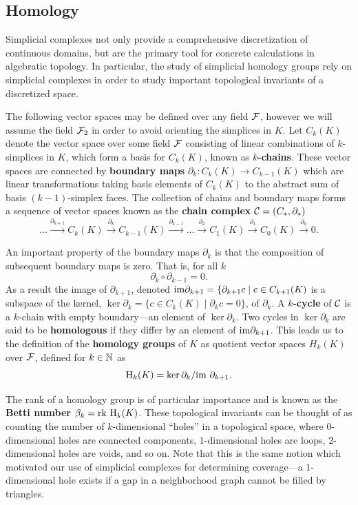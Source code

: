 
\subsection{Homology} %
\label{sec:homology}

Simplicial complexes not only provide a comprehensive discretization of continuous domains, but are the primary tool for concrete calculations in algebratic topology.
In particular, the study of simplicial homology groups rely on simplicial complexes in order to study important topological invariants of a discretized space.

The following vector spaces may be defined over any field $\mathcal{F}$, however we will assume the field $\mathcal{F}_2$ in order to avoid orienting the simplices in $K$.
Let $C_k(K)$ denote the vector space over some field $\mathcal{F}$ consisting of linear combinations of $k$-simplices in $K$, which form a basis for $C_k(K)$, known as \textbf{$k$-chains}.
These vector spaces are connected by \textbf{boundary maps} $\partial_k:C_k(K)\to C_{k-1}(K)$ which are linear transformations taking basis elements of $C_k(K)$ to the abstract sum of basis $(k-1)$-simplex faces.
The collection of chains and boundary maps forms a sequence of vector spaces known as the \textbf{chain complex} $\mathcal{C} = (C_*,\partial_*)$
\[
    \ldots\xrightarrow{\partial_{k+1}}
    C_k(K)\xrightarrow{\partial_{k}}
    C_{k-1}(K)\xrightarrow{\partial_{k-1}}
    \ldots\xrightarrow{\partial_2}
    C_1(K)\xrightarrow{\partial_{1}}
    C_0(K)\xrightarrow{\partial_0} 0.
\]

An important property of the boundary maps $\partial_k$ is that the composition of subsequent boundary maps is zero.
That is, for all $k$
\[
  \partial_k\circ\partial_{k-1} = 0.
\]
As a result the image of $\partial_{k+1}$, denoted $\mathrm{im}\partial_{k+1} = \{\partial_{k+1}c\mid c\in C_{k+1}(K)$ is a subspace of the kernel, $\ker\partial_k = \{c\in C_k(K)\mid \partial_k c = 0\}$, of $\partial_k$.
A \textbf{$k$-cycle} of $\mathcal{C}$ is a $k$-chain with empty boundary---an element of $\ker\partial_k$.
Two cycles in $\ker\partial_k$ are said to be \textbf{homologous} if they differ by an element of $\mathrm{im}\partial_{k+1}$.
This leads us to the definition of the \textbf{homology groups} of $K$ as quotient vector spaces $H_k(K)$ over $\mathcal{F}$, defined for $k\in\mathbb{N}$ as
\[
  \mathrm{H}_k(K) = \ker\partial_k/\mathrm{im}~\partial_{k+1}.
\]

The rank of a homology group is of particular importance and is known as the \textbf{Betti number} $\beta_k = \mathrm{rk}~ \mathrm{H}_k(K)$.
These topological invariants can be thought of as counting the number of $k$-dimensional ``holes'' in a topological space, where $0$-dimensional holes are connected components, $1$-dimensional holes are loops, $2$-dimensional holes are voids, and so on.
Note that this is the same notion which motivated our use of simplicial complexes for determining coverage---a $1$-dimensional hole exists if a gap in a neighborhood graph cannot be filled by triangles.


